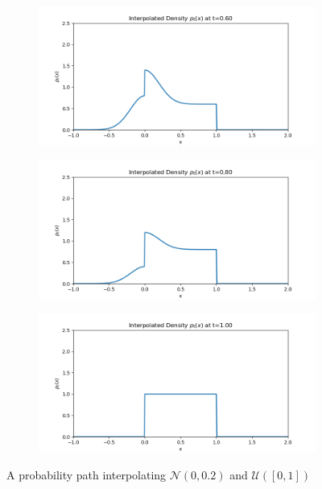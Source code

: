 \documentclass[a4paper,12pt]{article}
\begin{document}
\begin{figure}[htbp]
\begin{subfigure}[b]{0.45\textwidth}
      \caption{}
    \end{subfigure}
    \hfill
    \begin{subfigure}[b]{0.45\textwidth}
      \includegraphics[width=\linewidth]{frames/frame_4.png}
      \caption{}
    \end{subfigure}
    \par\medskip
    \begin{subfigure}[b]{0.45\textwidth}
      \includegraphics[width=\linewidth]{frames/frame_5.png}
      \caption{}
    \end{subfigure}
    \hfill
    \begin{subfigure}[b]{0.45\textwidth}
      \includegraphics[width=\linewidth]{frames/frame_6.png}
      \caption{}
    \end{subfigure}
    \caption{A probability path interpolating $\mathcal{N}(0,0.2)$ and $\mathcal{U}([0,1])$}
    \label{fig:interpolated_density}
\end{figure}
\end{document}
